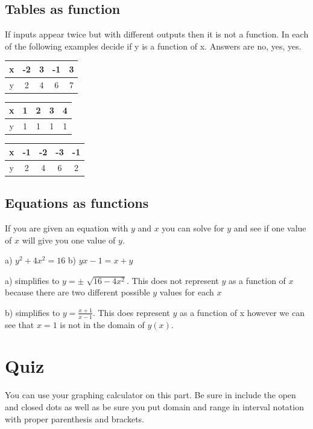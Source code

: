 \documentclass{tufte-handout}
\begin{document}
\subsection{Tables as function}
If inputs appear twice but with different outputs then it is not a function.  In each of the following examples decide if y is a function of x. Answers are no, yes, yes.
\begin{table}
\centering
\begin{tabular}{c || c | c | c | c}
x & -2 & 3 & -1 & 3 \\
\hline
y & 2 & 4 & 6 & 7 \\
\end{tabular}
\quad
\begin{tabular}{c || c | c | c | c}
x & 1 & 2 & 3 & 4 \\
\hline
y & 1 & 1 & 1 & 1 \\
\end{tabular}
\quad
\begin{tabular}{c || c | c | c | c}
x & -1 & -2 & -3 & -1 \\
\hline
y & 2 & 4 & 6 & 2 \\
\end{tabular}
\end{table}

\subsection{Equations as functions}
If you are given an equation with $y$ and $x$ you can solve for $y$ and see if one value of $x$ will give you one value of $y$.

a) $y^2 + 4x^2 = 16$ \hspace{1 cm} b) $ yx-1 = x + y$

a) simplifies to $ y = \pm \sqrt[]{16 - 4x^2}$.  This does not represent $y$ as a function of $x$ because there are two different possible $y$ values for each $x$

b) simplifies to $ y = \frac{x+1}{x-1}$. This does represent $y$ as a function of x however we can see that $x=1$ is not in the domain of $y(x)$.

\section{Quiz}
You can use your graphing calculator on this part.  Be sure in include the open and closed dots as well as be sure you put domain and range in interval notation with proper parenthesis and brackets.
\end{document}
